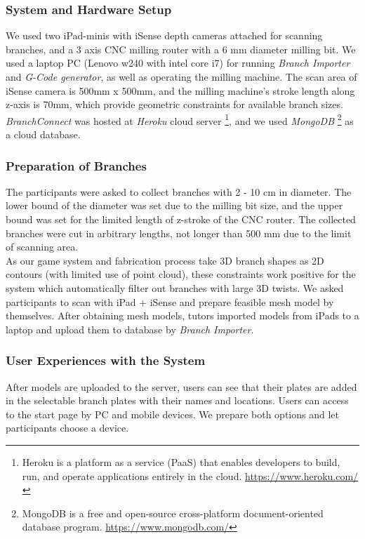 \subsubsection*{System and Hardware Setup}
We used two iPad-minis with iSense depth cameras attached for scanning branches, and a 3 axis CNC milling router with a 6 mm diameter milling bit.
We used a laptop PC (Lenovo w240 with intel core i7) for running \textit{Branch Importer} and \textit{G-Code generator}, as well as operating the milling machine.
The scan area of iSense camera is 500mm x 500mm, and the milling machine's stroke length along z-axis is 70mm, which provide geometric constraints for available branch sizes.
\textit{BranchConnect} was hosted at \textit{Heroku} cloud server \footnote{ Heroku is a platform as a service (PaaS) that enables developers to build, run, and operate applications entirely in the cloud. \url{https://www.heroku.com/}},
and we used \textit{MongoDB} \footnote{ MongoDB is a free and open-source cross-platform document-oriented database program. \url{https://www.mongodb.com/}} as a cloud database.

\subsubsection*{Preparation of Branches}
The participants were asked to collect branches with 2 - 10 cm in diameter.
The lower bound of the diameter was set due to the milling bit size, and the upper bound was set for the limited length of z-stroke of the CNC router.
The collected branches were cut in arbitrary lengths, not longer than 500 mm due to the limit of scanning area. \\

As our game system and fabrication process take 3D branch shapes as 2D contours (with limited use of point cloud), these constraints work positive for the system which automatically filter out branches with large 3D twists.
We asked participants to scan with iPad + iSense and prepare feasible mesh model by themselves.
After obtaining mesh models, tutors imported models from iPads to a laptop and upload them to database by \textit{Branch Importer}.


\subsubsection*{User Experiences with the System}
After models are uploaded to the server, users can see that their plates are added in the selectable branch plates with their names and locations.
Users can access to the start page by PC and mobile devices.
We prepare both options and let participants choose a device.

